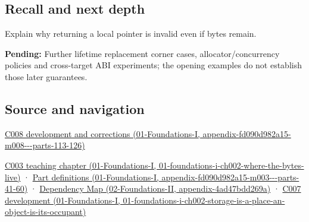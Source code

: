 \subsection{Recall and next depth}\label{appendix-0b104bcba06b-recall-and-next-depth}

Explain why returning a local pointer is invalid even if bytes remain.

\textbf{Pending:} Further lifetime replacement corner cases, allocator/concurrency policies and cross-target ABI experiments; the opening examples do not establish those later guarantees.

\subsection{Source and navigation}\label{appendix-0b104bcba06b-source-and-navigation}

\href{../01-Foundations-I/main.pdf\#nameddest=appendix-fd090d982a15-m008---parts-113-126}{C008 development and corrections (01-Foundations-I, appendix-fd090d982a15-m008-\/-\/-parts-113-126)}

\href{../01-Foundations-I/main.pdf\#nameddest=01-foundations-i-ch002-where-the-bytes-live}{C003 teaching chapter (01-Foundations-I, 01-foundations-i-ch002-where-the-bytes-live)} · \href{../01-Foundations-I/main.pdf\#nameddest=appendix-fd090d982a15-m003---parts-41-60}{Part definitions (01-Foundations-I, appendix-fd090d982a15-m003-\/-\/-parts-41-60)} · \href{../02-Foundations-II/main.pdf\#nameddest=appendix-4ad47bdd269a}{Dependency Map (02-Foundations-II, appendix-4ad47bdd269a)} · \href{../01-Foundations-I/main.pdf\#nameddest=01-foundations-i-ch002-storage-is-a-place-an-object-is-its-occupant}{C007 development (01-Foundations-I, 01-foundations-i-ch002-storage-is-a-place-an-object-is-its-occupant)}
